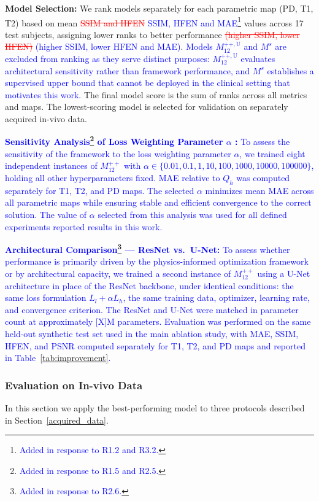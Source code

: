 \documentclass[journal,twoside,web]{ieeecolor}
\newcommand{\added}[1]{\textcolor{blue}{#1}}      %
\newcommand{\deleted}[1]{\textcolor{red}{\st{#1}}} %
\begin{document}
\textbf{Model Selection:} We rank models separately for each parametric map (PD, T1, T2) based on mean \deleted{SSIM and HFEN} \added{SSIM, HFEN and MAE\footnote{\textcolor{blue}{Added in response to R1.2 and R3.2.}}} values across 17 test subjects, assigning lower ranks to better performance \deleted{(higher SSIM, lower HFEN)} 
\added{(higher SSIM, lower HFEN and MAE)}. \added{Models $M_{12}^{++,\text{U}}$ and $M^{s}$ are excluded from ranking as they serve} \added{distinct purposes: $M_{12}^{++,\text{U}}$ evaluates architectural sensitivity rather than framework performance, and $M^{s}$ establishes a supervised upper bound that cannot be deployed in the clinical setting that motivates this work.} The final model score is the sum of ranks across all metrics and maps. The lowest-scoring model is selected for validation on separately acquired in-vivo data.


\added{\textbf{Sensitivity Analysis\footnote{\textcolor{blue}{Added in response to R1.5 and R2.5.}} of Loss Weighting Parameter $\alpha$ :} To assess the sensitivity of the framework to the loss weighting parameter $\alpha$, we trained eight independent instances of 
$M_{12}^{++}$ with $\alpha \in \{0.01, 0.1, 1, 10, 100, 1000, 10000, 100000\}$, holding all other hyperparameters fixed. MAE relative to $Q_h$ was computed separately for T1, T2, and PD maps. The selected $\alpha$ minimizes mean MAE across  all parametric maps while ensuring stable and efficient convergence to the correct solution. The value of $\alpha$ selected from this analysis was used for all defined experiments 
reported results in this work.}


\added{\textbf{Architectural Comparison\footnote{\textcolor{blue}{Added in response to R2.6.}} --- ResNet vs.\ U-Net:} To assess whether performance is primarily driven by the physics-informed optimization framework or by architectural capacity, we trained a second instance of $M_{12}^{++}$ using a U-Net architecture in place of the 
ResNet backbone, under identical conditions: the same loss formulation $L_l + \alpha L_h$, the same training data, optimizer, learning rate, and convergence criterion. The ResNet and U-Net were matched in parameter count at approximately [X]M parameters. Evaluation was performed on the same held-out synthetic test set used in the main ablation study, with MAE, SSIM, HFEN, and PSNR computed separately for T1, T2, and PD maps and reported in Table~\ref{tab:improvement}.}

\subsubsection{Evaluation on In-vivo Data}
In this section we apply the best-performing model to three protocols described in Section~\ref{acquired_data}. 
\end{document}
